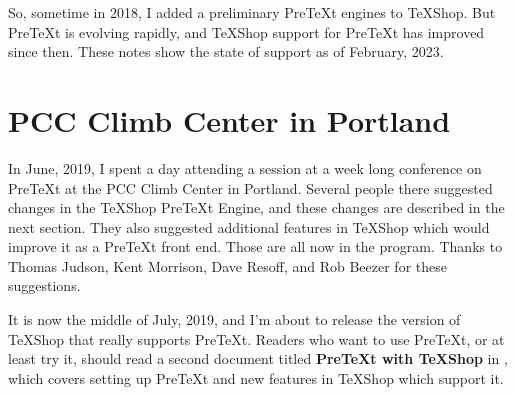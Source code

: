 \documentclass[11pt, oneside]{article}   	%
\begin{document}
So, sometime in 2018, I added a preliminary PreTeXt engines to TeXShop. But PreTeXt is evolving rapidly, and TeXShop support for PreTeXt has improved since then. These notes show the state of support as of February, 2023.
\newpage

\section{PCC Climb Center in Portland}

In June, 2019, I spent a day attending a session at a week long  conference on PreTeXt at the PCC Climb Center in Portland.
Several people there suggested changes in the TeXShop PreTeXt Engine, and these changes are described in the next section. They also suggested additional features in TeXShop which would improve it as a PreTeXt front end. Those are all now in the program. Thanks to Thomas Judson, Kent Morrison, Dave Resoff, and Rob Beezer
for these suggestions.

It is now the middle of July, 2019, and I'm about to release the version of TeXShop that really supports PreTeXt.
Readers who want to use PreTeXt, or at least try it, should read a second document  titled {\bf PreTeXt with TeXShop} in , which  covers setting up PreTeXt and new features in TeXShop which support it.
\end{document}
